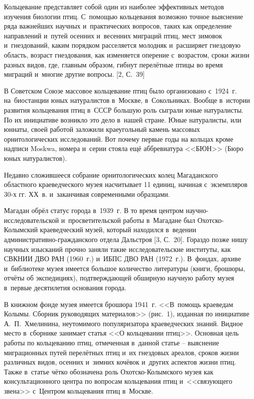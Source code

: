  

\makeProcTitle
{}

Кольцевание представляет собой один из наиболее эффективных методов изучения биологии птиц. С~помощью кольцевания возможно точное выяснение ряда важнейших научных и~практических вопросов, таких как определение направлений и~путей осенних и~весенних миграций птиц, мест зимовок и~гнездований, каким порядком расселяется молодняк и~расширяет гнездовую область, возраст гнездования, как изменяется оперение с~возрастом, сроки жизни разных видов, где, главным образом, гибнут перелётные птицы во время миграций и~многие другие вопросы. [2, С.~39]

В Советском Союзе массовое кольцевание птиц было организовано с~1924~г. на~биостанции юных натуралистов в~Москве, в~Сокольниках. Вообще в~истории развития кольцевания птиц в~СССР большую роль сыграли юные натуралисты. По их инициативе возникло это дело в~нашей стране. Юные натуралисты, или юннаты, своей работой заложили краеугольный камень массовых орнитологических исследований. Вот почему первые годы на кольцах кроме надписи Moskwa, номера и~серии стояла ещё аббревиатура <<БЮН>> (Бюро юных натуралистов).



Недавно сложившееся собрание орнитологических колец Магаданского областного краеведческого музея насчитывает 11 единиц, начиная с~экземпляров 30-х гг. ХХ~в. и~заканчивая современными образцами.

Магадан обрёл статус города в~1939~г. В то время центром научно-исследовательской и~просветительской работы в~Магадане был Охотско-Колымский краеведческий музей, который находился в~ведении ад\-ми\-нист\-ра\-тив\-но-гражданского отдела Дальстроя [3, С.~20]. Гораздо позже нишу научных изысканий прочно заняли такие исследовательские институты, как СВКНИИ ДВО РАН (1960~г.) и~ИБПС ДВО РАН (1972~г.). В~фондах, архиве и~библиотеке музея имеется большое количество литературы (книги, брошюры, отчёты об экспедициях), подтверждающей обширную научную работу музея в~первые десятилетия основания города.

В книжном фонде музея имеется брошюра 1941~г. <<В~помощь краеведам Колымы. Сборник руководящих материалов>> (рис.~1), изданная по инициативе А.~П.~Хмелинина, неутомимого популяризатора краеведческих знаний. Видное место в~сборнике занимает статья <<О кольцевании птиц>>. Основная цель работы по кольцеванию птиц, отмеченная в~данной статье – выяснение миграционных путей перелётных птиц и~их гнездовых ареалов, сроков жизни различных видов, осенних и~зимних кочёвок и~других аспектов жизни птиц. Также в~статье чётко обозначена роль Охотско-Колымского музея как консультационного центра по вопросам кольцевания птиц и~<<связующего звена>> с~Центром кольцевания птиц в~Москве.

